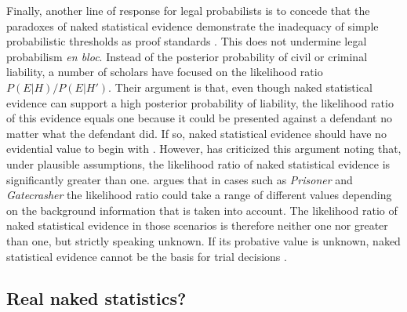 \documentclass{article}
\begin{document}
Finally, another line of response for legal probabilists is to concede that the paradoxes of naked statistical evidence demonstrate the inadequacy of simple probabilistic thresholds as proof standards  \citep{Urbaniak2019standards2}.
This does not undermine legal probabilism \emph{en bloc}.  Instead of the posterior probability of civil or criminal liability, a number of scholars have focused on the likelihood ratio $P(E\vert H)/P(E \vert H')$. Their argument is that, even though naked statistical evidence can support a high posterior probability of liability, the likelihood ratio of this evidence equals one because it could be presented against a defendant  no matter what the defendant did. If so, naked statistical evidence should have no evidential value to begin with \citep{cheng2012reconceptualizing,sullivan2016LikelihoodStoryTheory}. 
 However, \cite{dahlmanNakedStat2020} has criticized this argument noting that, under plausible assumptions, the likelihood ratio of naked statistical evidence is significantly greater than one.  %
\cite{dibello2019TrialStatisticsHigh} argues  
that in cases such as \textit{Prisoner} and \textit{Gatecrasher} the likelihood ratio could take a range of different values depending on the background information that is taken into account. The likelihood ratio of naked statistical evidence in those scenarios is therefore neither one nor greater than one, but strictly speaking unknown. If its probative value is unknown, naked statistical evidence cannot be the basis for trial decisions
%
%
\citep[for a critique of this argument, see][]{Urbaniak2020Decision}.





\subsection{Real naked statistics?}
\end{document}
